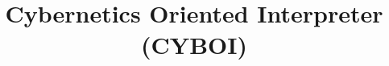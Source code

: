 %
%
%
%
%

%
%
%
%
\begin{titlepage}
    \title{
        Cybernetics Oriented Interpreter\\
        (CYBOI)\\
        \vspace{1cm}
        \begin{normalsize}
            \textmd{\subtitlemacro\\}
        \end{normalsize}
    }
    \author{
        \date{
        }
    }
\end{titlepage}
